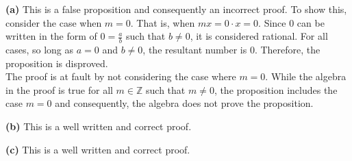 \documentclass{article}
\begin{document}
\textbf{(a)}
This is a false proposition and consequently an incorrect proof. To show this, consider the case when $m = 0$. That is, when $mx = 0 \cdot x = 0$. Since 0 can be written in the form of $0 = \frac{a}{b}$ such that $b \neq 0$, it is considered rational. For all cases, so long as $a = 0$ and $b \neq 0$, the resultant number is 0. Therefore, the proposition is disproved.\\

The proof is at fault by not considering the case where $m = 0$. While the algebra in the proof is true for all $m \in \mathbb{Z}$ such that $m \neq 0$, the proposition includes the case $m = 0$ and consequently, the algebra does not prove the proposition.

\textbf{(b)} 
This is a well written and correct proof.

\textbf{(c)}
This is a well written and correct proof.
\end{document}
